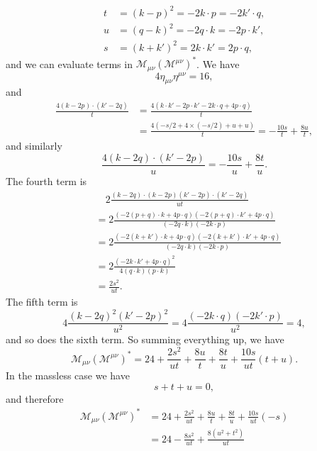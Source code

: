 \documentclass[hyperref, a4paper]{article}
\begin{document}
\begin{itemize}
\begin{equation}
    \begin{aligned}
        t &= (k-p)^2 = -2 k \cdot p = -2 k' \cdot q, \\
        u &= (q-k)^2 = - 2 q \cdot k = - 2 p \cdot k', \\
        s &= (k+k')^2 = 2 k \cdot k' = 2 p \cdot q,
    \end{aligned}
\end{equation}
and we can evaluate terms in $\mathcal{M}_{\mu \nu} (\mathcal{M}^{\mu \nu})^*$. We have  
\[
    4 \eta_{\mu \nu} \eta^{\mu \nu} = 16,
\]
and
\[
    \begin{aligned}
        \frac{4 (k-2p) \cdot (k'-2q)}{t} &= \frac{4 (k \cdot k' - 2 p \cdot k' - 2 k \cdot q + 4 p \cdot q)}{t} \\
        &= \frac{4 (-s/2 + 4 \times (-s/2) + u + u)}{t} = - \frac{10 s}{t} + \frac{8 u}{t},
    \end{aligned}
\]
and similarly 
\[
    \frac{4 (k-2q) \cdot (k'-2p)}{u} = - \frac{10 s}{u} + \frac{8t}{u}.
\]
The fourth term is 
\[
    \begin{aligned}
        &\quad 2 \frac{(k-2q) \cdot (k-2p) (k'-2p) \cdot (k'-2q)}{ut} \\
        &= 2 \frac{ (-2 (p+q) \cdot k + 4 p \cdot q) (-2 (p+q) \cdot k' + 4 p \cdot q) }{(-2 q\cdot k) (-2 k \cdot p)} \\
        &= 2 \frac{ (-2 (k+k') \cdot k + 4 p \cdot q) (-2 (k+k') \cdot k' + 4 p \cdot q) }{(-2 q\cdot k) (-2 k \cdot p)} \\
        &= 2 \frac{(- 2 k \cdot k' + 4 p \cdot q)^2}{4 (q \cdot k) (p \cdot k)} \\
        &= \frac{2 s^2}{ut}.
    \end{aligned}
\]
The fifth term is 
\[
    4 \frac{(k-2q)^2 (k'-2p)^2}{u^2} =  4\frac{(- 2 k \cdot q) (-2 k' \cdot p)}{u^2} = 4,
\]
and so does the sixth term. So summing everything up, we have 
\[
    \mathcal{M}_{\mu \nu} (\mathcal{M}^{\mu \nu})^* = 24 + \frac{2s^2}{ut} + \frac{8u}{t} + \frac{8t}{u} + \frac{10 s}{ut} (t + u).
\]
In the massless case we have 
\begin{equation}
    s + t + u = 0,
\end{equation}
and therefore 
\[
    \begin{aligned}
        \mathcal{M}_{\mu \nu} (\mathcal{M}^{\mu \nu})^* &= 24 + \frac{2s^2}{ut} + \frac{8u}{t} + \frac{8t}{u} + \frac{10 s}{ut} (-s) \\
        &= 24 - \frac{8 s^2}{ut} + \frac{8 (u^2 + t^2)}{ut} \\

\end{aligned}\]
\end{itemize}
\end{document}
